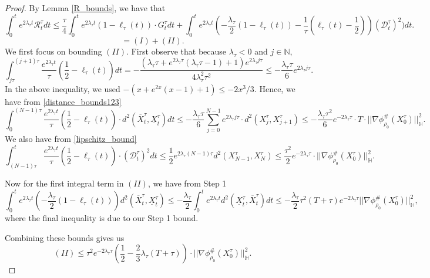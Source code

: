 \documentclass[11pt,a4paper]{amsart}
\newcommand{\1}{\mathds{1}}
\newcommand{\N}{\mathbb{N}}
\numberwithin{equation}{section}
\begin{document}
\begin{proof}
By Lemma \ref{R_bounds}, we have that
\[ \int_0^t e^{2 \lambda_{\tau} t} \mathcal{R}^{\tau}_t dt \leq \frac{\tau}{4}\int_0^t e^{2 \lambda_{\tau} t}  (1-\ell_{\tau}(t)) \cdot G^{\tau}_t dt + \int_0^t e^{2 \lambda_{\tau} t}\left( -\frac{\lambda_{\tau}}{2}  (1-\ell_{\tau}(t)) - \frac{1}{\tau}(\ell_{\tau}(t)-\frac{1}{2}) \right)  (\mathcal{D}_{t}^{\tau})^2) dt.  \]
\[ = (I) + (II). \] We first focus on bounding $(II)$. First observe that because $\lambda_{\tau} < 0$ and $j \in \N$,
\[ \int_{j \tau}^{(j+1)\tau}  \frac{e^{2 \lambda_{\tau} t}}{\tau}(\frac{1}{2}-\ell_{\tau}(t)) dt = - \frac{ (\lambda_{\tau} \tau + e^{2 \lambda_{\tau} \tau}(\lambda_{\tau} \tau - 1) + 1)e^{2 \lambda_{\tau} j \tau} }{4\lambda_{\tau}^2 \tau^2} \leq -\frac{\lambda_{\tau} \tau}{6} e^{2 \lambda_{\tau} j \tau}.  \]  In the above inequality, we used $-(x+e^{2x}(x-1)+1) \leq -2x^3/3$. Hence, we have from \eqref{distance_bounds123}
\[ \int_0^{(N-1)\tau}  \frac{e^{2 \lambda_{\tau} t}}{\tau} (\frac{1}{2} - \ell_{\tau}(t)) \cdot d^2(\overline{X}^{\tau}_t,\underline{X}_t^{\tau}) dt \leq -\frac{\lambda_{\tau} \tau}{6} \sum_{j=0}^{N-1} e^{2 \lambda_{\tau} j \tau} \cdot d^2(X^{\tau}_j,X^{\tau}_{j+1}) \leq -\frac{\lambda_{\tau} \tau^2 }{6}   e^{-2 \lambda_{\tau} \tau} \cdot T \cdot ||\nabla \phi^{\#}_{\rho_0}(X^{\tau}_0)||^2_{\mathbb{H}}. \] We also have from \eqref{lipschitz_bound}
\[ \int_{(N-1) \tau}^t \frac{e^{2 \lambda_{\tau} t}}{\tau} (\frac{1}{2} - \ell_{\tau}(t)) \cdot (\mathcal{D}_t^{\tau})^2 dt \leq \frac{1}{2}  e^{2 \lambda_{\tau}(N-1) \tau}d^2(X^{\tau}_{N-1},X^{\tau}_{N}) \leq  \frac{\tau^2}{2} e^{-2 \lambda_{\tau} \tau} \cdot ||\nabla \phi^{\#}_{\rho_0}(X_0^{\tau})||^2_{\mathbb{H}} .     \]


Now for the first integral term in $(II)$, we have from Step 1
\[ \int_0^t e^{2\lambda_{\tau} t} \left( -\frac{\lambda_{\tau}}{2}(1-\ell_{\tau}(t)) \right) d^2(\overline{X}_{t}^{\tau},\underline{X}_t^{\tau}) \leq -\frac{\lambda_{\tau}}{2} \int_0^t e^{2\lambda_{\tau} t} d^2(\underline{X}_t^{\tau},\overline{X}^{\tau}_t) dt \leq -\frac{\lambda_{\tau}}{2} \tau^2(T+\tau)e^{-2 \lambda_{\tau} \tau} ||\nabla \phi^{\#}_{\rho_0}(X_0^{\tau})||^2_{\mathbb{H}}, \] where the final inequality is due to our Step 1 bound. \smallskip

Combining these bounds gives us
\[ (II) \leq  \tau^2e^{-2\lambda_{\tau} \tau} \left( \frac{1}{2} -  \frac{2}{3} \lambda_{\tau}(T+\tau)   \right) \cdot||\nabla \phi^{\#}_{\rho_0}(X^{\tau}_0)||^2_{\mathbb{H}}. \] 


\end{proof}
\end{document}
